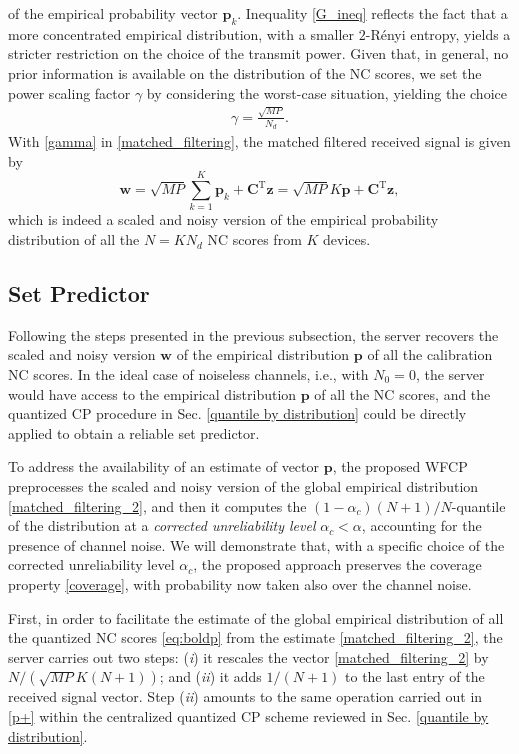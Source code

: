 \documentclass[12pt, draftclsnofoot, onecolumn]{IEEEtran}
\begin{document}
of the empirical probability vector $\boldsymbol{p}_k$. Inequality \eqref{G_ineq} reflects the fact that a more concentrated empirical distribution, with a smaller $2$-Rényi entropy, yields a stricter restriction on the choice of the transmit power. Given that, in general, no prior information is available on the distribution of the NC scores, we set the power scaling factor $\gamma$ by considering the worst-case situation, yielding the choice
\begin{align}\label{gamma}
    \gamma=\frac{\sqrt{MP}}{N_d}.
\end{align}
With \eqref{gamma} in \eqref{matched_filtering}, the matched filtered received signal is given by
\begin{equation}\label{matched_filtering_2}
    \boldsymbol{w} = \sqrt{MP}\sum_{k=1}^K\boldsymbol{p}_k + \boldsymbol{C}^{\mathrm{T}}\boldsymbol{z} = \sqrt{MP}K\boldsymbol{p} + \boldsymbol{C}^{\mathrm{T}}\boldsymbol{z},
\end{equation}
which is indeed a scaled and noisy version of the empirical probability distribution of all the $N=KN_d$ NC scores from $K$ devices.

\subsection{Set Predictor}\label{analysis}
Following the steps presented in the previous subsection, the server recovers the scaled and noisy version $\boldsymbol{w}$ of the empirical distribution $\boldsymbol{p}$ of all the calibration NC scores. In the ideal case of noiseless channels, i.e., with $N_0=0$, the server would have access to the empirical distribution $\boldsymbol{p}$ of all the NC scores, and the quantized CP procedure in Sec. \ref{quantile by distribution} could be directly applied to obtain a reliable set predictor. 

To address the availability of an estimate of vector $\boldsymbol{p}$, the proposed WFCP preprocesses the scaled and noisy version of the global empirical distribution \eqref{matched_filtering_2}, and then it computes the $(1-\alpha_c)(N+1)/N$-quantile of the distribution at a \emph{corrected unreliability level} $\alpha_c<\alpha$, accounting for the presence of channel noise. We will demonstrate that, with a specific choice of the corrected unreliability level $\alpha_c$, the proposed approach preserves the coverage property \eqref{coverage}, with probability now taken also over the channel noise.

First, in order to facilitate the estimate of the global empirical distribution of all the quantized NC scores \eqref{eq:boldp} from the estimate \eqref{matched_filtering_2}, the server carries out two steps: (\emph{i}) it rescales the vector \eqref{matched_filtering_2} by $N/(\sqrt{MP}K(N+1))$; and (\emph{ii}) it adds $1/(N+1)$ to the last entry of the received signal vector. Step (\emph{ii}) amounts to the same operation carried out in \eqref{p+} within the centralized quantized CP scheme reviewed in Sec. \ref{quantile by distribution}.
\end{document}
